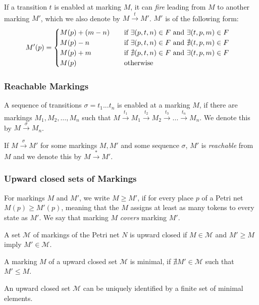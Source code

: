 If a transition $t$ is enabled at marking $M$, it can \emph{fire} leading from $M$ to another marking $M'$, which we also denote by  $M \xrightarrow{t} M'$. 
$M'$ is of the following form:
\begin{equation*}
M'(p) =  
\begin{cases}
\mathrlap{M(p) + (m - n)}\hphantom{M(p) + (m - n) + 1} \text{ if } \exists (p,t,n) \in F \text{ and } \exists (t,p,m) \in F \\
\mathrlap{M(p) - n}\hphantom{M(p) + (m - n) + 1} \text{ if } \exists (p,t,n) \in F \text{ and } \nexists (t,p,m) \in F \\
\mathrlap{M(p) + m}\hphantom{M(p) + (m - n) + 1} \text{ if }  \nexists (p,t,n) \in F \text{ and } \exists (t,p,m) \in F  \\
\mathrlap{M(p)}\hphantom{M(p) + (m - n) + 1} \text{ otherwise}
\end{cases}
\end{equation*}

\subsubsection{Reachable Markings}
A sequence of transitions $\sigma = t_{1}...t_{n}$ is enabled at a marking $M$, if there are markings $M_{1},M_{2},\dots,M_{n}$ such that $M \xrightarrow{t_{1}} M_{1} \xrightarrow{t_{2}} M_{2} \xrightarrow{t_{3}} ... \xrightarrow{t_{n}} M_{n}$. We denote this by $M \xrightarrow{\sigma} M_{n}$. 

If $M \xrightarrow{\sigma} M'$ for some markings $M,M'$ and some sequence $\sigma$, $M'$ is \emph{reachable} from $M$ and we denote this by $M \xrightarrow{*} M'$.


\subsubsection{Upward closed sets of Markings}
For markings $M$ and $M'$, we write $M \ge M'$, if for every place $p$ of a Petri net $M(p) \ge M'(p)$, meaning that the $M$ assigns at least as many tokens to every state as $M'$. We say that marking $M$ \emph{covers} marking $M'$.


A set $\mathcal{M}$ of markings of the Petri net $N$ is upward closed if $M \in \mathcal{M}$ and $M' \ge M$ imply $M' \in \mathcal{M}$.

A marking $M$ of a upward closed set $\mathcal{M}$ is minimal, if $\nexists M' \in \mathcal{M}$ such that $M' \le M$.

An upward closed set $\mathcal{M}$ can be uniquely identified by a finite set of minimal elements. 
